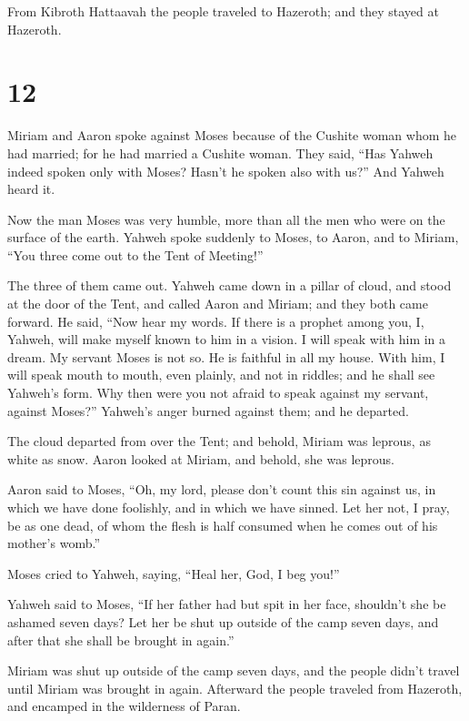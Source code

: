  From Kibroth Hattaavah the people traveled to Hazeroth;
and they stayed at Hazeroth.

\hypertarget{section-11}{%
\section{12}\label{section-11}}

 Miriam and Aaron spoke against Moses because of the Cushite
woman whom he had married; for he had married a Cushite woman.
 They said, ``Has Yahweh indeed spoken only with Moses?
Hasn't he spoken also with us?'' And Yahweh heard it.

 Now the man Moses was very humble, more than all the men
who were on the surface of the earth.  Yahweh spoke suddenly
to Moses, to Aaron, and to Miriam, ``You three come out to the Tent of
Meeting!''

The three of them came out.  Yahweh came down in a pillar of
cloud, and stood at the door of the Tent, and called Aaron and Miriam;
and they both came forward.  He said, ``Now hear my words.
If there is a prophet among you, I, Yahweh, will make myself known to
him in a vision. I will speak with him in a dream.  My
servant Moses is not so. He is faithful in all my house. 
With him, I will speak mouth to mouth, even plainly, and not in riddles;
and he shall see Yahweh's form. Why then were you not afraid to speak
against my servant, against Moses?''  Yahweh's anger burned
against them; and he departed.

 The cloud departed from over the Tent; and behold, Miriam
was leprous, as white as snow. Aaron looked at Miriam, and behold, she
was leprous.

 Aaron said to Moses, ``Oh, my lord, please don't count
this sin against us, in which we have done foolishly, and in which we
have sinned.  Let her not, I pray, be as one dead, of whom
the flesh is half consumed when he comes out of his mother's womb.''

 Moses cried to Yahweh, saying, ``Heal her, God, I beg
you!''

 Yahweh said to Moses, ``If her father had but spit in her
face, shouldn't she be ashamed seven days? Let her be shut up outside of
the camp seven days, and after that she shall be brought in again.''

 Miriam was shut up outside of the camp seven days, and the
people didn't travel until Miriam was brought in again. 
Afterward the people traveled from Hazeroth, and encamped in the
wilderness of Paran.

